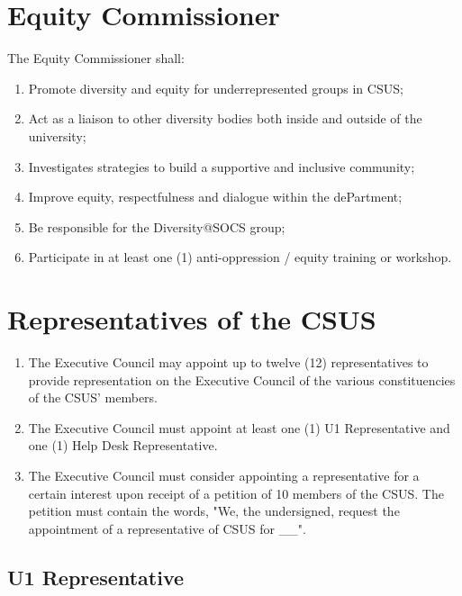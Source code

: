 \section{Equity Commissioner}\label{equity-commissioner}

The Equity Commissioner shall:

\begin{enumerate}
\def\labelenumi{\arabic{enumi}.}
\item
  Promote diversity and equity for underrepresented groups in CSUS;
\item
  Act as a liaison to other diversity bodies both inside and outside of
  the university;
\item
  Investigates strategies to build a supportive and inclusive community;
\item
  Improve equity, respectfulness and dialogue within the dePartment;
\item
  Be responsible for the Diversity@SOCS group;
\item
  Participate in at least one (1) anti-oppression / equity training or
  workshop.
\end{enumerate}

\section{Representatives of the
CSUS}\label{representatives-of-the-csus}

\begin{enumerate}
\def\labelenumi{\arabic{enumi}.}
\item
  The Executive Council may appoint up to twelve (12) representatives to
  provide representation on the Executive Council of the various
  constituencies of the CSUS' members.
\item
  The Executive Council must appoint at least one (1) U1 Representative
  and one (1) Help Desk Representative.
\item
  The Executive Council must consider appointing a representative for a
  certain interest upon receipt of a petition of 10 members of the CSUS.
  The petition must contain the words, "We, the undersigned, request
  the appointment of a representative of CSUS for \_\_".
\end{enumerate}

\subsection{U1 Representative}\label{u1-representative}

